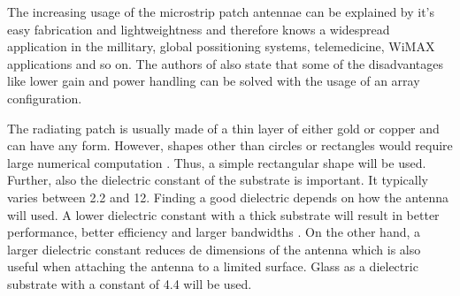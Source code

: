 The increasing usage of the microstrip patch antennae can be explained by it's easy fabrication and lightweightness and therefore knows a widespread application in the millitary, global possitioning systems, telemedicine, WiMAX applications and so on.
The authors of \cite{J13_microstripadvantages} also state that some of the disadvantages like lower gain and power handling can be solved with the usage of an array configuration.

The radiating patch is usually made of a thin layer of either gold or copper \cite{J14_antennadesign,J15_antennadesign}
and can have any form. However, shapes other than circles or rectangles would require large numerical computation \cite{J14_antennadesign}.
Thus, a simple rectangular shape will be used.
Further, also the dielectric constant of the substrate is important. It typically varies between 2.2 and 12.
Finding a good dielectric depends on how the antenna will used. A lower
dielectric constant with a thick substrate will result in better performance, better efficiency and larger bandwidths  \cite{J15_antennadesign}.
On the other hand, a larger dielectric constant reduces de dimensions of the antenna \cite{J14_antennadesign}
which is also useful when attaching the 
antenna to a limited surface. Glass as a dielectric substrate with a constant of 4.4 will be used.